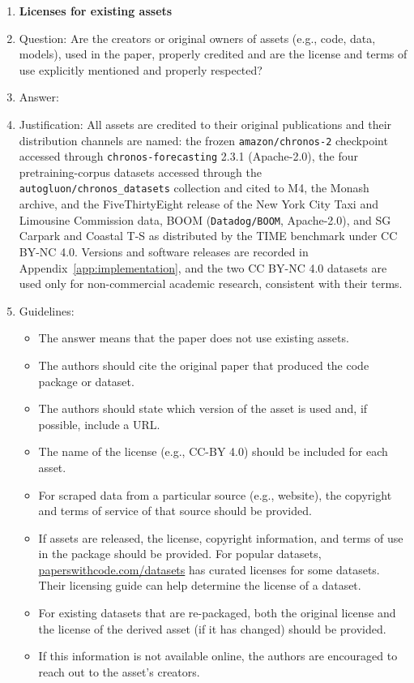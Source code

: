 \begin{enumerate}
\item {\bf Licenses for existing assets}
    \item[] Question: Are the creators or original owners of assets (e.g., code, data, models), used in the paper, properly credited and are the license and terms of use explicitly mentioned and properly respected?
    \item[] Answer: \answerYes{}
    \item[] Justification: All assets are credited to their original publications and their distribution channels are named: the frozen \texttt{amazon/chronos-2} checkpoint accessed through \texttt{chronos-forecasting} 2.3.1 (Apache-2.0), the four pretraining-corpus datasets accessed through the \texttt{autogluon/chronos\_datasets} collection and cited to M4, the Monash archive, and the FiveThirtyEight release of the New York City Taxi and Limousine Commission data, BOOM (\texttt{Datadog/BOOM}, Apache-2.0), and SG Carpark and Coastal T-S as distributed by the TIME benchmark under CC BY-NC 4.0. Versions and software releases are recorded in Appendix~\ref{app:implementation}, and the two CC BY-NC 4.0 datasets are used only for non-commercial academic research, consistent with their terms.
    \item[] Guidelines:
    \begin{itemize}
        \item The answer \answerNA{} means that the paper does not use existing assets.
        \item The authors should cite the original paper that produced the code package or dataset.
        \item The authors should state which version of the asset is used and, if possible, include a URL.
        \item The name of the license (e.g., CC-BY 4.0) should be included for each asset.
        \item For scraped data from a particular source (e.g., website), the copyright and terms of service of that source should be provided.
        \item If assets are released, the license, copyright information, and terms of use in the package should be provided. For popular datasets, \url{paperswithcode.com/datasets} has curated licenses for some datasets. Their licensing guide can help determine the license of a dataset.
        \item For existing datasets that are re-packaged, both the original license and the license of the derived asset (if it has changed) should be provided.
        \item If this information is not available online, the authors are encouraged to reach out to the asset's creators.
    \end{itemize}


\end{enumerate}
